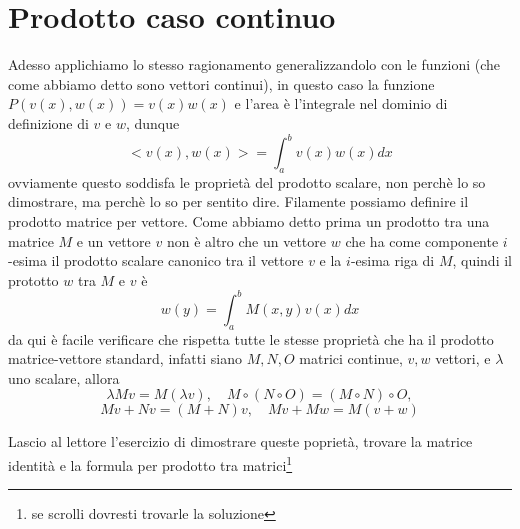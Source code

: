 \documentclass[11pt,a4paper]{article}
\theoremstyle{definition}
\theoremstyle{plain}
\theoremstyle{plain}
\begin{document}
		\section{Prodotto caso continuo}
			Adesso applichiamo lo stesso ragionamento generalizzandolo con le funzioni (che come abbiamo detto sono vettori continui), in questo caso la funzione $P(v(x),w(x))=v(x)w(x)$ e l'area è l'integrale nel dominio di definizione di $v$ e $w$, dunque
			\begin{equation}
				<v(x),w(x)>=\int_a^b v(x)w(x)dx
			\end{equation}
			ovviamente questo soddisfa le proprietà del prodotto scalare, non perchè lo so dimostrare, ma perchè lo so per sentito dire.\newline
			Filamente possiamo definire il prodotto matrice per vettore. Come abbiamo detto prima un prodotto tra una matrice $M$ e un vettore $v$ non è altro che un vettore $w$ che ha come componente $i$-esima il prodotto scalare canonico tra il vettore $v$ e la $i$-esima riga di $M$, quindi il prototto $w$ tra $M$ e $v$ è
			\begin{equation}
				w(y)=\int_a^b M(x,y)v(x) dx
			\end{equation}
			da qui è facile verificare che rispetta tutte le stesse proprietà che ha il prodotto matrice-vettore standard, infatti siano $M, N, O$ matrici continue, $v,w$ vettori, e $\lambda$ uno scalare, allora 
			\begin{equation}
				\lambda Mv= M(\lambda v),\quad M\circ (N \circ O)= (M \circ N) \circ O,
			\end{equation}
			\[
				Mv + Nv=  (M+N)v,\quad Mv+Mw=M(v+w)
			\]
			
			Lascio al lettore l'esercizio di dimostrare queste poprietà, trovare la matrice identità e la formula per prodotto tra matrici\footnote{se scrolli dovresti trovarle la soluzione}
		
\end{document}

